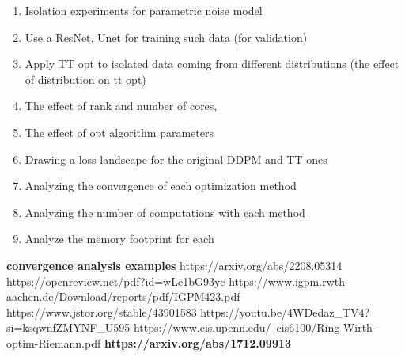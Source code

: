 \documentclass[11pt]{article}
\begin{document}
    \begin{enumerate}
        \item Isolation experiments for parametric noise model
        \item Use a ResNet, Unet for training such data (for validation)
        \item Apply TT opt to isolated data coming from different distributions (the effect of distribution on tt opt)
        \item The effect of rank and number of cores,
        \item The effect of opt algorithm parameters
        \item Drawing a loss landscape for the original DDPM and TT ones
        \item Analyzing the convergence of each optimization method
        \item Analyzing the number of computations with each method
        \item Analyze the memory footprint for each
    \end{enumerate}
    \textbf{convergence analysis examples}
    https://arxiv.org/abs/2208.05314
    https://openreview.net/pdf?id=wLe1bG93yc
    https://www.igpm.rwth-aachen.de/Download/reports/pdf/IGPM423.pdf
    https://www.jstor.org/stable/43901583
    https://youtu.be/4WDedaz_TV4?si=ksqwnfZMYNF_U595
    https://www.cis.upenn.edu/~cis6100/Ring-Wirth-optim-Riemann.pdf
    \textbf{https://arxiv.org/abs/1712.09913}
\end{document}

